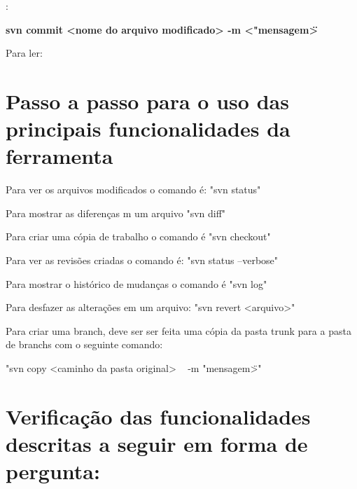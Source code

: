 \begin{multicols}{2} 


:{

\colorbox{PineGreen}{
\begin{minipage}{210px}
  \textbf{svn commit <nome do arquivo modificado> -m <"mensagem\">}
\end{minipage}
}
}

Para ler:

\colorbox{PineGreen}{
\begin{minipage}{100px}
\end{minipage}
}

\end{multicols}

\section{Passo a passo para o uso das principais funcionalidades da ferramenta}

Para ver os arquivos modificados o comando é: "svn status"

Para mostrar as diferenças m um arquivo "svn diff"

Para criar uma cópia de trabalho o comando é "svn checkout"

Para ver as revisões criadas o comando é: "svn status --verbose"

Para mostrar o histórico de mudanças o comando é "svn log"

Para desfazer as alterações em um arquivo: "svn revert <arquivo>"

Para criar uma branch, deve ser ser feita uma cópia da pasta trunk para a pasta de branchs com o seguinte comando:

"svn copy <caminho da pasta original> \ <caminho da pasta de destino, essa pasta deve possuir o nome da branch> -m "mensagem\">"

\section{Verificação das funcionalidades descritas a seguir em forma de pergunta:}

